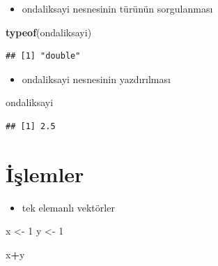 \documentclass[
  oneside]{book}
\newenvironment{Shaded}{\begin{snugshade}}{\end{snugshade}}
\newcommand{\DecValTok}[1]{\textcolor[rgb]{0.00,0.00,0.81}{#1}}
\newcommand{\FunctionTok}[1]{\textcolor[rgb]{0.13,0.29,0.53}{\textbf{#1}}}
\newcommand{\NormalTok}[1]{#1}
\newcommand{\OtherTok}[1]{\textcolor[rgb]{0.56,0.35,0.01}{#1}}
\newcommand{\SpecialCharTok}[1]{\textcolor[rgb]{0.81,0.36,0.00}{\textbf{#1}}}
\providecommand{\tightlist}{%
  \setlength{\itemsep}{0pt}\setlength{\parskip}{0pt}}
\begin{document}
\begin{itemize}
\tightlist
\item
  ondaliksayi nesnesinin türünün sorgulanması
\end{itemize}

\begin{Shaded}
\begin{Highlighting}[]
\FunctionTok{typeof}\NormalTok{(ondaliksayi)}
\end{Highlighting}
\end{Shaded}

\begin{verbatim}
## [1] "double"
\end{verbatim}

\begin{itemize}
\tightlist
\item
  ondaliksayi nesnesinin yazdırılması
\end{itemize}

\begin{Shaded}
\begin{Highlighting}[]
\NormalTok{ondaliksayi}
\end{Highlighting}
\end{Shaded}

\begin{verbatim}
## [1] 2.5
\end{verbatim}

\hypertarget{iux15flemler}{%
\section{İşlemler}\label{iux15flemler}}

\begin{itemize}
\tightlist
\item
  tek elemanlı vektörler
\end{itemize}

\begin{Shaded}
\begin{Highlighting}[]
\NormalTok{x }\OtherTok{\textless{}{-}} \DecValTok{1}
\NormalTok{y }\OtherTok{\textless{}{-}} \DecValTok{1}
\end{Highlighting}
\end{Shaded}

\begin{Shaded}
\begin{Highlighting}[]
\NormalTok{x}\SpecialCharTok{+}\NormalTok{y}
\end{Highlighting}
\end{Shaded}
\end{document}
